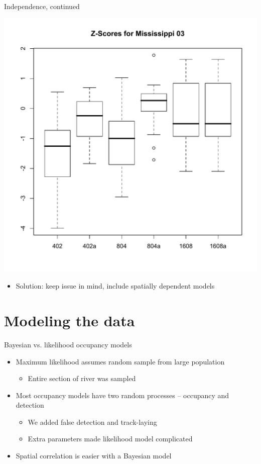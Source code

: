 \documentclass{beamer}
\begin{document}
\begin{frame}{Independence, continued}
	\begin{center}
		\includegraphics[scale=0.4]{independenceBoxplots.pdf}
	\end{center}
	\begin{itemize}
		\item Solution: keep issue in mind, include spatially dependent models
	\end{itemize}
\end{frame}

\section{Modeling the data}

\begin{frame}{Bayesian vs. likelihood occupancy models}
	\begin{itemize}
		\item Maximum likelihood assumes random sample from large population
		\begin{itemize}
			\item Entire section of river was sampled
		\end{itemize}
		\item Most occupancy models have two random processes -- occupancy and
		detection
		\begin{itemize}
			\item We added false detection and track-laying
			\item Extra parameters made likelihood model complicated
		\end{itemize}
		\item Spatial correlation is easier with a Bayesian model
	\end{itemize}
\end{frame}
\end{document}
